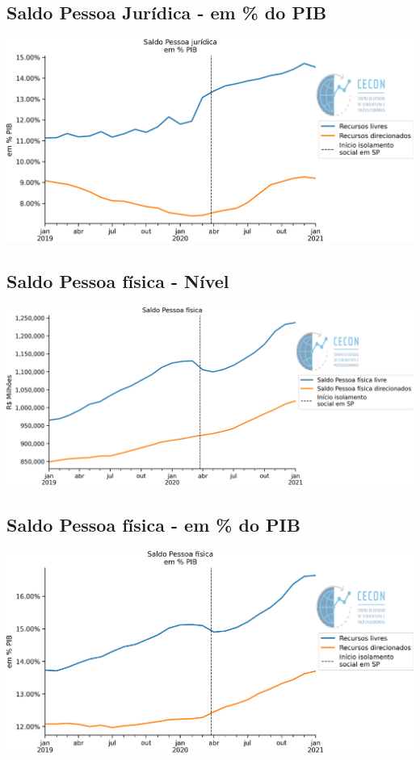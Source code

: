 \documentclass{SelfArx}
\begin{document}
\subsection*{Saldo Pessoa Jurídica - em \% do PIB}
\label{sec:org5c6672d}
\begin{center}
\includegraphics[width=.9\linewidth]{./figs/Credito/SaldoPJ_PIB.png}
\end{center}

\subsection*{Saldo Pessoa física - Nível}
\label{sec:org52d7456}

\begin{center}
\includegraphics[width=.9\linewidth]{./figs/Credito/SaldoPF.png}
\end{center}


\subsection*{Saldo Pessoa física - em \% do PIB}
\label{sec:org5b9feed}

\begin{center}
\includegraphics[width=.9\linewidth]{./figs/Credito/SaldoPF_PIB.png}
\end{center}
\end{document}
